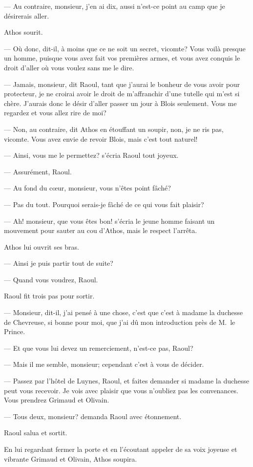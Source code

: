— Au contraire, monsieur, j'en ai dix, aussi n'est-ce point au camp que je désirerais aller.

Athos sourit.

— Où donc, dit-il, à moins que ce ne soit un secret, vicomte? Vous voilà presque un homme, puisque vous avez fait vos premières armes, et vous avez conquis le droit d'aller où vous voulez sans me le dire.

— Jamais, monsieur, dit Raoul, tant que j'aurai le bonheur de vous avoir pour protecteur, je ne croirai avoir le droit de m'affranchir d'une tutelle qui m'est si chère. J'aurais donc le désir d'aller passer un jour à Blois seulement. Vous me regardez et vous allez rire de moi?

— Non, au contraire, dit Athos en étouffant un soupir, non, je ne ris pas, vicomte. Vous avez envie de revoir Blois, mais c'est tout naturel!

— Ainsi, vous me le permettez? s'écria Raoul tout joyeux.

— Assurément, Raoul.

— Au fond du cœur, monsieur, vous n'êtes point fâché?

— Pas du tout. Pourquoi serais-je fâché de ce qui vous fait plaisir?

— Ah! monsieur, que vous êtes bon! s'écria le jeune homme faisant un mouvement pour sauter au cou d'Athos, mais le respect l'arrêta.

Athos lui ouvrit ses bras.

— Ainsi je puis partir tout de suite?

— Quand vous voudrez, Raoul.

Raoul fit trois pas pour sortir.

— Monsieur, dit-il, j'ai pensé à une chose, c'est que c'est à madame la duchesse de Chevreuse, si bonne pour moi, que j'ai dû mon introduction près de M.~le Prince.

— Et que vous lui devez un remerciement, n'est-ce pas, Raoul?

— Mais il me semble, monsieur; cependant c'est à vous de décider.

— Passez par l'hôtel de Luynes, Raoul, et faites demander si madame la duchesse peut vous recevoir. Je vois avec plaisir que vous n'oubliez pas les convenances. Vous prendrez Grimaud et Olivain.

— Tous deux, monsieur? demanda Raoul avec étonnement.

Raoul salua et sortit.

En lui regardant fermer la porte et en l'écoutant appeler de sa voix joyeuse et vibrante Grimaud et Olivain, Athos soupira.

